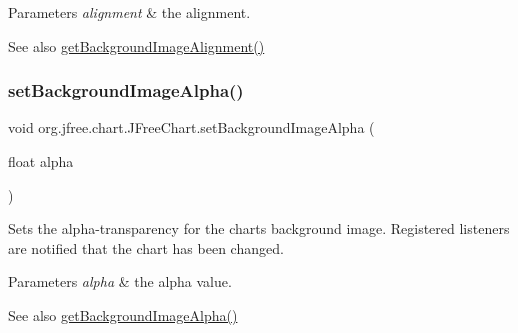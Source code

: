 \begin{DoxyParams}{Parameters}
{\em alignment} & the alignment.\\
\hline
\end{DoxyParams}
\begin{DoxySeeAlso}{See also}
\mbox{\hyperlink{classorg_1_1jfree_1_1chart_1_1_j_free_chart_a2a1cf4fd0bd2aa6c7fb2ec37fabfb6f1}{get\+Background\+Image\+Alignment()}} 
\end{DoxySeeAlso}
\mbox{\label{classorg_1_1jfree_1_1chart_1_1_j_free_chart_afe8e3a04968eed8d032c08b259aa7f46}} 
\subsubsection{\texorpdfstring{set\+Background\+Image\+Alpha()}{setBackgroundImageAlpha()}}
{\footnotesize\ttfamily void org.\+jfree.\+chart.\+J\+Free\+Chart.\+set\+Background\+Image\+Alpha (\begin{DoxyParamCaption}\item[{float}]{alpha }\end{DoxyParamCaption})}

Sets the alpha-\/transparency for the chart\textquotesingle{}s background image. Registered listeners are notified that the chart has been changed.


\begin{DoxyParams}{Parameters}
{\em alpha} & the alpha value.\\
\hline
\end{DoxyParams}
\begin{DoxySeeAlso}{See also}
\mbox{\hyperlink{classorg_1_1jfree_1_1chart_1_1_j_free_chart_afe2ea70105325860b5ef380c25e42866}{get\+Background\+Image\+Alpha()}} 
\end{DoxySeeAlso}
\mbox{\label{classorg_1_1jfree_1_1chart_1_1_j_free_chart_a425911935a24fdd3fde08dca49512c2a}} 
